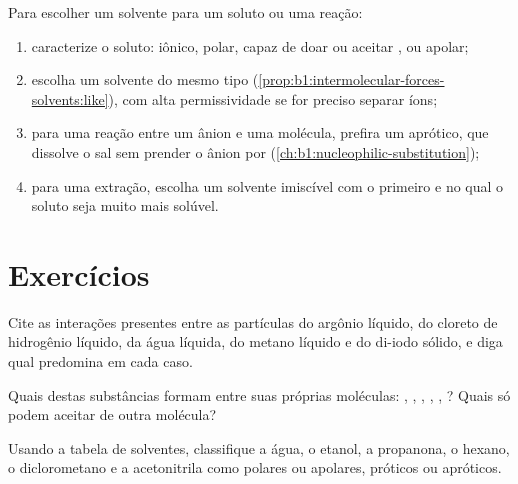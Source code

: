 \begin{method}\label{met:b1:intermolecular-forces-solvents:choose}
Para escolher um solvente para um soluto ou uma reação:
\begin{enumerate}
  \item caracterize o soluto: iônico, polar, capaz de doar ou aceitar
        , ou apolar;
  \item escolha um solvente do mesmo tipo (\cref{prop:b1:intermolecular-forces-solvents:like}),
        com alta permissividade se for preciso separar íons;
  \item para uma reação entre um ânion e uma molécula, prefira um
         aprótico, que dissolve o sal sem prender o ânion
        por  (\cref{ch:b1:nucleophilic-substitution});
  \item para uma extração, escolha um solvente imiscível com o primeiro
        e no qual o soluto seja muito mais solúvel.
\end{enumerate}
\end{method}

\section{Exercícios}

\begin{exercise}[$\star$]\label{exo:b1:intermolecular-forces-solvents:1}
Cite as interações presentes entre as partículas do argônio líquido, do
cloreto de hidrogênio líquido, da água líquida, do metano líquido e do
di-iodo sólido, e diga qual predomina em cada caso.
\end{exercise}

\begin{exercise}[$\star$]\label{exo:b1:intermolecular-forces-solvents:2}
Quais destas substâncias formam  entre suas
próprias moléculas: , , , , ,
? Quais só podem aceitar  de outra molécula?
\end{exercise}

\begin{exercise}[$\star$]\label{exo:b1:intermolecular-forces-solvents:3}
Usando a tabela de solventes, classifique a água, o etanol, a propanona,
o hexano, o diclorometano e a acetonitrila como polares ou apolares,
próticos ou apróticos.
\end{exercise}

